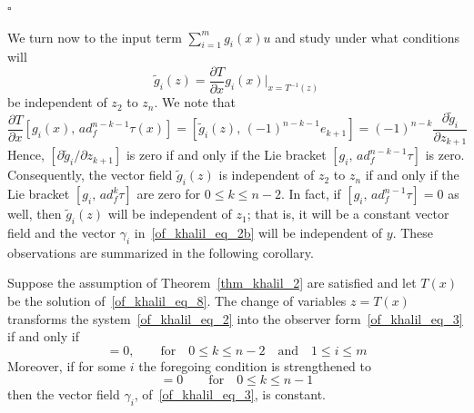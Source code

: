 \documentclass[12pt,a4paper,oneside]{book}
\begin{document}
\begin{onehalfspace}
\begin{thm}
	\hfill$\square$
\end{thm}
We turn now to the input term $\sum_{i=1}^{m}g_i(x)u$ and study under what conditions will 
\begin{equation*}
	\tilde{g}_i(z)=\frac{\partial T}{\partial x}g_i(x)\Bigg|_{x=T^{-1}(z)}
\end{equation*}
be independent of $z_2$ to $z_n$. We note that 
\begin{equation*}
	\frac{\partial T}{\partial x}[g_i(x),\,ad_f^{n-k-1}\tau(x)]=[\tilde{g}_i(z),\,(-1)^{n-k-1}e_{k+1}]=(-1)^{n-k}\frac{\partial \tilde{g}_i}{\partial z_{k+1}}
\end{equation*}
Hence, $[\partial \tilde{g}_i/\partial z_{k+1}]$ is zero if and only if the Lie bracket $[g_i,\,ad_f^{n-k-1}\tau]$ is zero. Consequently, the vector field $\tilde{g}_i(z)$ is independent of $z_2$ to $z_n$ if and only if the Lie bracket $[g_i,\,ad_f^k\tau]$ are zero for $0\le k\le n-2$. In fact, if $[g_i,\,ad_f^{n-1}\tau]=0$ as well, then $\tilde{g}_i(z)$ will be independent of $z_1$; that is, it will be a constant vector field and the vector $\gamma_i$ in~\eqref{of_khalil_eq_2b} will be independent of $y$. These observations are summarized in the following corollary.
\begin{corollary}\label{corollary_khalil_1}
	Suppose the assumption of Theorem~\ref{thm_khalil_2} are satisfied and let $T(x)$ be the solution of~\eqref{of_khalil_eq_8}. The change of variables $z=T(x)$ transforms the system~\eqref{of_khalil_eq_2} into the observer form~\eqref{of_khalil_eq_3} if and only if
	\begin{equation*}
		[g_i,\,ad_f^k\tau]=0,\qquad\text{for}\quad 0\le k \le n-2 \quad\text{and}\quad 1\le i \le m
	\end{equation*}
 	Moreover, if for some $i$ the foregoing condition is strengthened to 
 	\begin{equation*}
 		[g_i,\,ad_f^k\tau]=0\qquad\text{for}\quad 0\le k \le n-1
 	\end{equation*}
 then the vector field $\gamma_i$, of~\eqref{of_khalil_eq_3}, is constant.
 

\end{corollary}
\end{onehalfspace}
\end{document}
